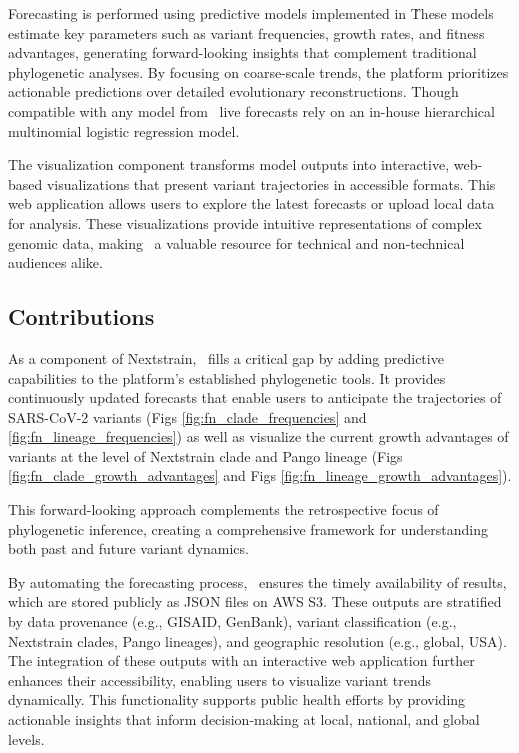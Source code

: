 Forecasting is performed using predictive models implemented in \evofr\.
These models estimate key parameters such as variant frequencies, growth rates, and fitness advantages, generating forward-looking insights that complement traditional phylogenetic analyses.
By focusing on coarse-scale trends, the platform prioritizes actionable predictions over detailed evolutionary reconstructions.
Though compatible with any model from \evofr\, live forecasts rely on an in-house hierarchical multinomial logistic regression model.

The visualization component transforms model outputs into interactive, web-based visualizations that present variant trajectories in accessible formats.
This web application allows users to explore the latest forecasts or upload local data for analysis.
These visualizations provide intuitive representations of complex genomic data, making \forecastsNcov\ a valuable resource for technical and non-technical audiences alike.

\subsection{Contributions}

As a component of Nextstrain, \forecastsNcov\ fills a critical gap by adding predictive capabilities to the platform’s established phylogenetic tools.
It provides continuously updated forecasts that enable users to anticipate the trajectories of SARS-CoV-2 variants (Figs \ref{fig:fn_clade_frequencies} and \ref{fig:fn_lineage_frequencies})  as well as visualize the current growth advantages of variants at the level of Nextstrain clade and Pango lineage (Figs \ref{fig:fn_clade_growth_advantages} and Figs \ref{fig:fn_lineage_growth_advantages}).

This forward-looking approach complements the retrospective focus of phylogenetic inference, creating a comprehensive framework for understanding both past and future variant dynamics.

By automating the forecasting process, \forecastsNcov\ ensures the timely availability of results, which are stored publicly as JSON files on AWS S3.
These outputs are stratified by data provenance (e.g., GISAID, GenBank), variant classification (e.g., Nextstrain clades, Pango lineages), and geographic resolution (e.g., global, USA).
The integration of these outputs with an interactive web application further enhances their accessibility, enabling users to visualize variant trends dynamically.
This functionality supports public health efforts by providing actionable insights that inform decision-making at local, national, and global levels.

